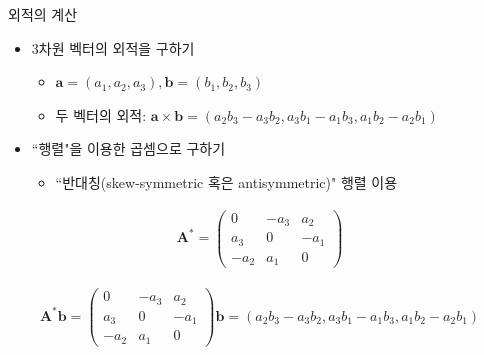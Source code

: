 \documentclass{beamer}
\begin{document}


\begin{frame}{외적의 계산}

\begin{itemize}
\item 3차원 벡터의 외적을 구하기
	\begin{itemize}
	\item $\mathbf a=(a_1, a_2, a_3), \mathbf b=(b_1, b_2, b_3)$
	\item 두 벡터의 외적: $\mathbf a \times \mathbf b = (a_2 b_3 - a_3 b_2, a_3 b_1 - a_1 b_3, a_1 b_2 - a_2 b_1)$
	\end{itemize}
\item ``행렬"을 이용한 곱셈으로 구하기
	\begin{itemize}
	\item ``반대칭(skew-symmetric 혹은 antisymmetric)" 행렬 이용
	\end{itemize}
\end{itemize}

\begin{eqnarray}
\mathbf A^* = \left ( 
\begin{array}{ccc}
0 & -a_3 & a_2 \\
a_3 & 0 & -a_1 \\
-a_2 & a_1 & 0 \nonumber
\end{array}
\right ) \nonumber
\end{eqnarray}

\begin{eqnarray}
\mathbf A^* \mathbf b = \left ( 
\begin{array}{ccc}
0 & -a_3 & a_2 \\
a_3 & 0 & -a_1 \\
-a_2 & a_1 & 0
\end{array}
\right ) \mathbf b
= (a_2 b_3 - a_3 b_2, a_3 b_1 - a_1 b_3, a_1 b_2 - a_2 b_1 ) \nonumber
\end{eqnarray}

\end{frame}

\end{document}
